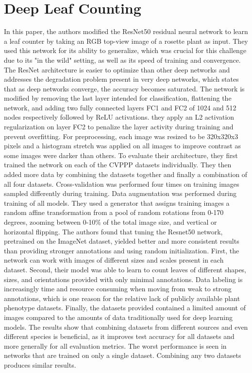\section{Deep Leaf Counting}
In this paper, the authors modified the ResNet50 residual neural network to learn a leaf counter by taking an RGB top-view image of a rosette plant as input.
They used this network for its ability to generalize, which was crucial for this challenge due to its "in the wild" setting, as well as its speed of training
and convergence. The ResNet architecture is easier to optimize than other deep networks and addresses the degradation problem present in very deep networks,
which states that as deep networks converge, the accuracy becomes saturated. The network is modified by removing the last layer intended for classification,
flattening the network, and adding two fully connected layers FC1 and FC2 of 1024 and 512 nodes respectively followed by ReLU activations. they apply an L2 activation
regularization on layer FC2 to penalize the layer activity during training and prevent overfitting. For preprocessing, each image was resized to be 320x320x3 pixels
and a histogram stretch was applied on all images to improve contrast as some images were darker than others. To evaluate their architecture, they first trained the network
on each of the CVPPP datasets individually. They then added more data by combining the datasets together and finally a combination of all four datasets.
Cross-validation was performed four times on training images sampled differently during training. Data augmentation was performed during training of all models.
They used a generator that assigns training images a random affine transformation from a pool of random rotations from 0-170 degrees, zooming between 0-10\% of the
total image size, and vertical or horizontal flipping. The authors found that tuning the Resnet50 network, pretrained on the ImageNet dataset, yielded better and
more consistent results than providing stronger annotations and using random initialization. First, the network can work with images of different sizes and scales
present in each dataset. Second, their model was able to learn to count leaves of different shapes, sizes, and orientations provided with only minimal annotations. 
Data labeling is increasingly time and resource consuming when moving from weak to strong annotations, which is one reason for the relative lack of publicly available
plant phenotype datasets. Finally, the datasets provided contained a limited amount of images compared to the amounts of data traditionally used for deep learning models.
The results show that combining datasets from different sources and even different species is beneficial, as it improves test accuracy for all datasets and more generally
for all evaluation metrics. The worst performance is seen in networks that are trained on only a single dataset. Combining any two datasets produces similar results.

